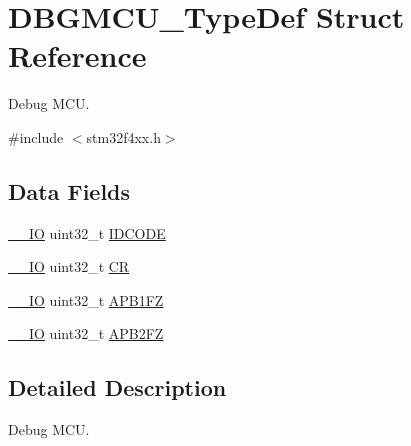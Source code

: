 \hypertarget{struct_d_b_g_m_c_u___type_def}{\section{D\-B\-G\-M\-C\-U\-\_\-\-Type\-Def Struct Reference}
\label{struct_d_b_g_m_c_u___type_def}
}


Debug M\-C\-U.  




{\ttfamily \#include $<$stm32f4xx.\-h$>$}

\subsection*{Data Fields}
\begin{DoxyCompactItemize}
\item 
\hyperlink{group___c_m_s_i_s__core__definitions_gaec43007d9998a0a0e01faede4133d6be}{\-\_\-\-\_\-\-I\-O} uint32\-\_\-t \hyperlink{struct_d_b_g_m_c_u___type_def_a24df28d0e440321b21f6f07b3bb93dea}{I\-D\-C\-O\-D\-E}
\item 
\hyperlink{group___c_m_s_i_s__core__definitions_gaec43007d9998a0a0e01faede4133d6be}{\-\_\-\-\_\-\-I\-O} uint32\-\_\-t \hyperlink{struct_d_b_g_m_c_u___type_def_ab40c89c59391aaa9d9a8ec011dd0907a}{C\-R}
\item 
\hyperlink{group___c_m_s_i_s__core__definitions_gaec43007d9998a0a0e01faede4133d6be}{\-\_\-\-\_\-\-I\-O} uint32\-\_\-t \hyperlink{struct_d_b_g_m_c_u___type_def_a5eaefc557573ae7bdc632ef6b6d574b5}{A\-P\-B1\-F\-Z}
\item 
\hyperlink{group___c_m_s_i_s__core__definitions_gaec43007d9998a0a0e01faede4133d6be}{\-\_\-\-\_\-\-I\-O} uint32\-\_\-t \hyperlink{struct_d_b_g_m_c_u___type_def_a4628a8c32f97ef93b15b2b503ef90c75}{A\-P\-B2\-F\-Z}
\end{DoxyCompactItemize}


\subsection{Detailed Description}
Debug M\-C\-U. 


